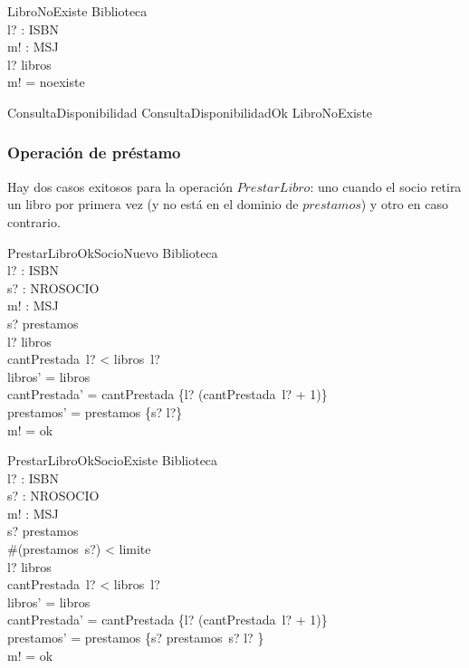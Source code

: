 \documentclass{article}
\begin{document}
\begin{schema}{LibroNoExiste}
\Xi Biblioteca \\
l? : ISBN \\ 
m! : MSJ \\
\where
l? \notin \dom libros \\
m! = noexiste \\
\end{schema}

\begin{zed}
ConsultaDisponibilidad  ConsultaDisponibilidadOk \lor LibroNoExiste
\end{zed}

\subsubsection*{Operación de préstamo}

Hay dos casos exitosos para la operación $PrestarLibro$: uno cuando el socio retira un libro por primera vez (y no está en el dominio de $prestamos$) y otro en caso contrario.

\begin{schema}{PrestarLibroOkSocioNuevo}
\Delta Biblioteca \\
l? : ISBN \\ 
s? : NROSOCIO \\
m! : MSJ \\
\where
s? \notin \dom prestamos \\
l? \in \dom libros \\
cantPrestada~l? < libros~l? \\
libros' = libros \\
cantPrestada' = cantPrestada \oplus \{l? \mapsto (cantPrestada~l? + 1)\} \\
prestamos' = prestamos \oplus \{s? \mapsto \langle l?\rangle\} \\
m! = ok \\
\end{schema}

\begin{schema}{PrestarLibroOkSocioExiste}
\Delta Biblioteca \\
l? : ISBN \\ 
s? : NROSOCIO \\
m! : MSJ \\
\where
s? \in \dom prestamos \\
\#(prestamos~s?) < limite \\
l? \in \dom libros \\
cantPrestada~l? < libros~l? \\
libros' = libros \\
cantPrestada' = cantPrestada \oplus \{l? \mapsto (cantPrestada~l? + 1)\} \\
prestamos' = prestamos \oplus \{s? \mapsto prestamos~s? \cat \langle l? \rangle\} \\
m! = ok \\
\end{schema}
\end{document}
